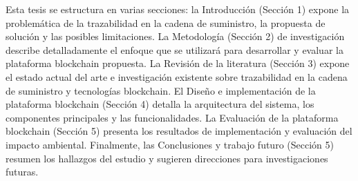 \documentclass[main.tex]{subfiles}
\begin{document}
Esta tesis se estructura en varias secciones: la Introducción (Sección 1) expone la problemática de la trazabilidad en la cadena de suministro, la propuesta de solución y las posibles limitaciones. La Metodología (Sección 2) de investigación describe detalladamente el enfoque que se utilizará para desarrollar y evaluar la plataforma blockchain propuesta. La Revisión de la literatura (Sección 3) expone el estado actual del arte e investigación existente sobre trazabilidad en la cadena de suministro y tecnologías blockchain. El Diseño e implementación de la plataforma blockchain (Sección 4) detalla la arquitectura del sistema, los componentes principales y las funcionalidades. La Evaluación de la plataforma blockchain (Sección 5) presenta los resultados de implementación y evaluación del impacto ambiental. Finalmente, las Conclusiones y trabajo futuro (Sección 5) resumen los hallazgos del estudio y sugieren direcciones para investigaciones futuras.
\end{document}
